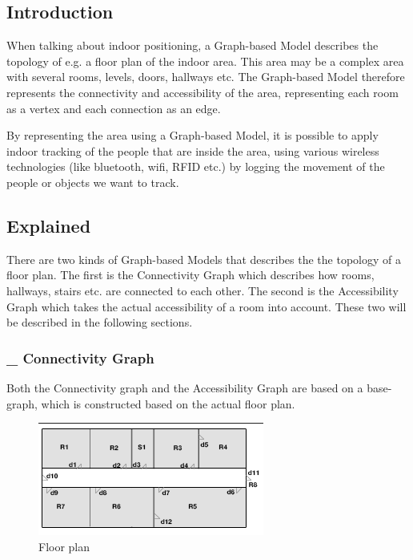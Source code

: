 \subsection{Introduction}
When talking about indoor positioning, a Graph-based Model describes the topology of e.g. a floor plan of the indoor area. 
This area may be a complex area with several rooms, levels, doors, hallways etc. 
The Graph-based Model therefore represents the connectivity and accessibility of the area, representing each room as a vertex and each connection as an edge. 

By representing the area using a Graph-based Model, it is possible to apply indoor tracking of the people that are inside the area, using various wireless technologies (like bluetooth, wifi, RFID etc.) by logging the movement of the people or objects we want to track.


\subsection{Explained}
There are two kinds of Graph-based Models that describes the the topology of a floor plan. 
The first is the Connectivity Graph which describes how rooms, hallways, stairs etc. are connected to each other. 
The second is the Accessibility Graph which takes the actual accessibility of a room into account. 
These two will be described in the following sections. \\


\subsubsection{ \_ Connectivity Graph}
Both the Connectivity graph and the Accessibility Graph are based on a base-graph, which is constructed based on the actual floor plan. 

\begin{figure}[H]%
\includegraphics{images/floorplan.png}%
\caption{Floor plan}%
\label{}%
\end{figure}%

